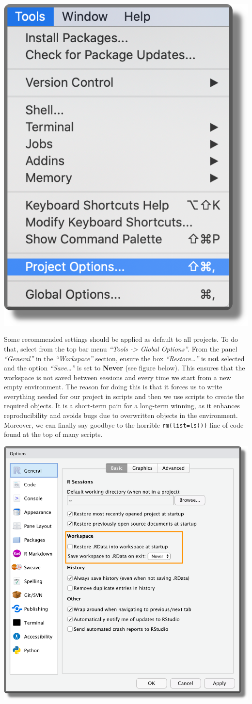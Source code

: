 \documentclass[
  11pt,
]{book}
\begin{document}
\begin{itemize}
  \begin{center}\includegraphics[width=0.4\linewidth]{images/projects/proj-options} \end{center}

  Some recommended settings should be applied as default to all projects. To do that, select from the top bar menu \emph{``Tools -\textgreater{} Global Options''}. From the panel \emph{``General''} in the \emph{``Workspace''} section, ensure the box \emph{``Restore\ldots{}''} is \textbf{not} selected and the option \emph{``Save\ldots{}''} is set to \textbf{Never} (see figure below). This ensures that the workspace is not saved between sessions and every time we start from a new empty environment. The reason for doing this is that it forces us to write everything needed for our project in scripts and then we use scripts to create the required objects. It is a short-term pain for a long-term winning, as it enhances reproducibility and avoids bugs due to overwritten objects in the environment. Moreover, we can finally say goodbye to the horrible \texttt{rm(list=ls())} line of code found at the top of many scripts.

  \begin{center}\includegraphics[width=0.6\linewidth]{images/projects/general-options} \end{center}


\end{itemize}
\end{document}
